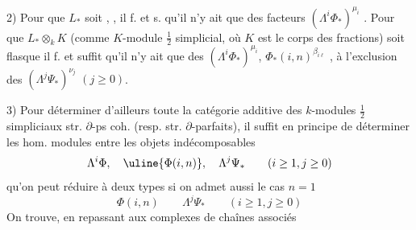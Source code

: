 2) Pour que $L_*$ soit , ,
il f. et s.
qu'il n'y ait que des facteurs
$(\Lambda^i\Phi_*)^{\mu_i}$
.
Pour que $L_*\otimes_k K$ (comme
$K$-module $\frac12$ simplicial, où $K$ est le
corps des fractions) soit flasque
il f. et suffit qu'il n'y ait que des
$(\Lambda^i\Phi_*)^{\mu_i}$, $\Phi_*(i,n)^{\beta_{i\ell}}$
, à l'exclusion
des $(\Lambda^j\Psi_*)^{\nu_j}$ $(j\geq0)$.

3) Pour déterminer d'ailleurs toute la
catégorie additive des $k$-modules
$\frac12$ simpliciaux str. $\partial$-ps coh. (resp.
str. $\partial$-parfaits), il suffit en principe
de déterminer les hom. modules
entre les objets indécomposables
\[
\Lambda^i\Phi,\quad\uline{\Phi(i,n)},\quad\Lambda^j\Psi_*
\qquad(i\geq1,j\geq0)
\]
qu'on peut réduire à deux types si
on admet aussi le cas $n=1$
\[
\Phi(i,n)\qquad\Lambda^j\Psi_*
\qquad(i\geq1,j\geq0)
\]
On trouve, en repassant aux
complexes de chaînes associés
